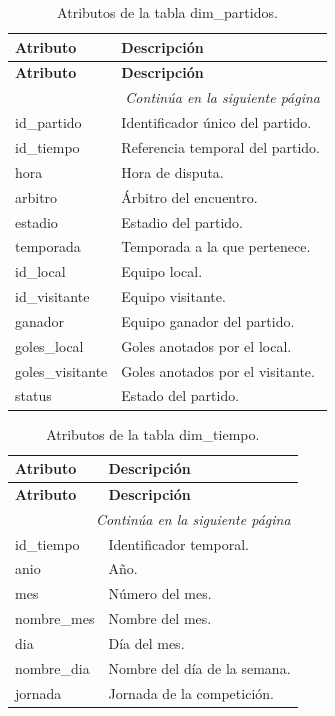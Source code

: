 \begin{longtable}{|l|l|}
\caption{Atributos de la tabla dim\_partidos.} \\

\hline
\textbf{Atributo} & \textbf{Descripción} \\
\hline
\endfirsthead

\hline
\textbf{Atributo} & \textbf{Descripción} \\
\hline
\endhead

\hline
\multicolumn{2}{r}{\textit{Continúa en la siguiente página}} \\
\hline
\endfoot

\hline
\endlastfoot

id\_partido & Identificador único del partido. \\
id\_tiempo & Referencia temporal del partido. \\
hora & Hora de disputa. \\
arbitro & Árbitro del encuentro. \\
estadio & Estadio del partido. \\
temporada & Temporada a la que pertenece. \\
id\_local & Equipo local. \\
id\_visitante & Equipo visitante. \\
ganador & Equipo ganador del partido. \\
goles\_local & Goles anotados por el local. \\
goles\_visitante & Goles anotados por el visitante. \\
status & Estado del partido. \\
\hline

\end{longtable}

\begin{longtable}{|l|l|}
\caption{Atributos de la tabla dim\_tiempo.} \\

\hline
\textbf{Atributo} & \textbf{Descripción} \\
\hline
\endfirsthead

\hline
\textbf{Atributo} & \textbf{Descripción} \\
\hline
\endhead

\hline
\multicolumn{2}{r}{\textit{Continúa en la siguiente página}} \\
\hline
\endfoot

\hline
\endlastfoot

id\_tiempo & Identificador temporal. \\
anio & Año. \\
mes & Número del mes. \\
nombre\_mes & Nombre del mes. \\
dia & Día del mes. \\
nombre\_dia & Nombre del día de la semana. \\
jornada & Jornada de la competición. \\
\hline

\end{longtable}

